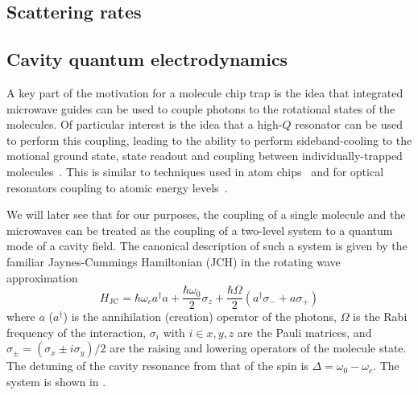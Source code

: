 \subsection{Scattering rates}


\subsection{Cavity quantum electrodynamics}

A key part of the motivation for a molecule chip trap is the idea that
integrated microwave guides can be used to couple photons to the rotational
states  of the molecules. Of particular interest is the idea
that a high-$Q$ resonator can be used to perform this coupling, leading to the
ability to perform sideband-cooling to the motional ground state, state readout
and coupling between individually-trapped molecules~\cite{Andre2006}. This is
similar to techniques used in atom chips~\cite{Treutlein2008} and for optical
resonators coupling to atomic energy levels~\cite{}.

We will later see that for our purposes, the coupling of a single molecule and
the microwaves can be treated as the coupling of a two-level system to a quantum
mode of a cavity field. The canonical description of such a system is given by
the familiar Jaynes-Cummings Hamiltonian (JCH) in the rotating wave
approximation~\cite{gerry_knight_2004}
%
\begin{equation}
  H_\text{JC} = \hbar\omega_c a^\dagger a + \frac{\hbar \omega_0}{2} \sigma_z +
  \frac{\hbar\Omega}{2}(a^\dagger \sigma_- + a\sigma_+)
  \label{theory:eqn:JCH}
\end{equation}
%
where $a$ ($a^\dagger$) is the annihilation (creation) operator of the photons,
$\Omega$ is the Rabi frequency of the interaction, $\sigma_i$ with $i\in{x, y,
z}$ are the Pauli matrices, and $\sigma_\pm =
(\sigma_x \pm i\sigma_y)/2$ are the raising and lowering operators of the
molecule state. The
detuning of the cavity resonance from that of the spin is $\Delta = \omega_0 -
\omega_c$. The system is shown in .

\begin{figure}
  \caption{}
  \label{theory:fig:JCHstates}
\end{figure}


